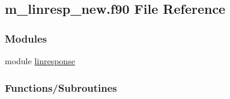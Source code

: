 \hypertarget{m__linresp__new_8f90}{}\subsection{m\+\_\+linresp\+\_\+new.\+f90 File Reference}
\label{m__linresp__new_8f90}
\subsubsection*{Modules}
\begin{DoxyCompactItemize}
\item 
module \hyperlink{namespacelinresponse}{linresponse}
\end{DoxyCompactItemize}
\subsubsection*{Functions/\+Subroutines}
